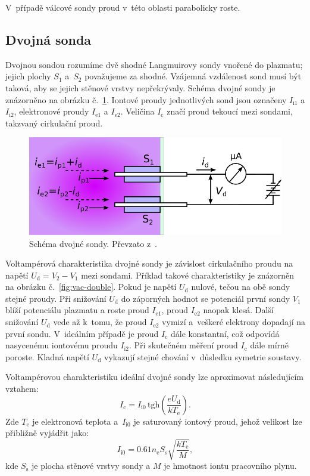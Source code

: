 \documentclass{protokol}
\newcommand\elemcharge{e}
\newcommand\boltzmann{k}
\newcommand{\tgh}{\mathrm{tgh}}
\newcommand\denselec{n_\mathrm{e}}
\newcommand\probesurf{S}
\newcommand\sheathsurf{S_\mathrm{s}}
\newcommand\tempelec{T_\mathrm{e}}
\newcommand\massion{M}
\newcommand\iioni{I_{\mathrm{i}1}}
\newcommand\iionii{I_{\mathrm{i}2}}
\newcommand\iionsat{I_{\mathrm{i}0}}
\newcommand\ieleci{I_{\mathrm{e}1}}
\newcommand\ielecii{I_{\mathrm{e}2}}
\newcommand\idouble{I_{\mathrm{c}}}
\newcommand\poti{V_1}
\newcommand\potii{V_2}
\newcommand\udouble{U_\mathrm{d}}
\begin{document}
V~případě válcové sondy proud v~této oblasti parabolicky roste.

\subsection{Dvojná sonda}
Dvojnou sondou rozumíme dvě shodné Langmuirovy sondy vnořené do plazmatu;
jejich plochy $\probesurf_1$ a~$\probesurf_2$ považujeme za shodné.
Vzájemná vzdálenost sond musí být taková, aby se jejich stěnové vrstvy
nepřekrývaly.
Schéma dvojné sondy je znázorněno na obrázku č.~\ref{fig:probe-double}.
Iontové proudy jednotlivých sond jsou označeny $\iioni$ a $\iionii$,
elektronové proudy $\ieleci$ a $\ielecii$.
Veličina $\idouble$ značí proud tekoucí mezi sondami,
takzvaný cirkulační proud.

\begin{figure}[hbp]
	\centering
	\includegraphics{probe-double}
	\caption{Schéma dvojné sondy.
		Převzato z~\autocite{assignment-doubleprobe}.}
	\label{fig:probe-double}
\end{figure}

Voltampérová charakteristika dvojné sondy je závislost cirkulačního proudu
na napětí $\udouble = \potii - \poti$ mezi sondami.
Příklad takové charakteristiky je znázorněn na obrázku č.~\ref{fig:vac-double}.
Pokud je napětí $\udouble$ nulové, tečou na obě sondy stejné proudy.
Při snižování $\udouble$ do záporných hodnot se potenciál první sondy $\poti$
blíží potenciálu plazmatu a roste proud $\ieleci$,
proud $\ielecii$ naopak klesá.
Další snižování $\udouble$ vede až k~tomu,
že proud $\ielecii$ vymizí a~veškeré elektrony dopadají na první sondu.
V~ideálním případě je proud $\idouble$ dále konstantní,
což odpovídá nasycenému iontovému proudu $\iionii$.
Při skutečném měření proud $\idouble$ dále mírně poroste.
Kladná napětí $\udouble$ vykazují stejné chování v~důsledku symetrie soustavy.

Voltampérovou charakteristiku ideální dvojné sondy lze aproximovat
následujícím vztahem:
\begin{equation}
	\label{eq:double-idouble}
	\idouble = \iionsat \, \tgh \left(
		\frac{\elemcharge\udouble}{\boltzmann\tempelec} \right).
\end{equation}
Zde $\tempelec$ je elektronová teplota
a~$\iionsat$ je saturovaný iontový proud, jehož velikost lze přibližně
vyjádřit jako:
\begin{equation}
	\label{eq:double-iionsat}
	\iionsat = \num{0.61} \denselec \sheathsurf
		\sqrt{\frac{\boltzmann\tempelec}{\massion}},
\end{equation}
kde $\sheathsurf$ je plocha stěnové vrstvy sondy
a $\massion$ je hmotnost iontu pracovního plynu.
\end{document}

